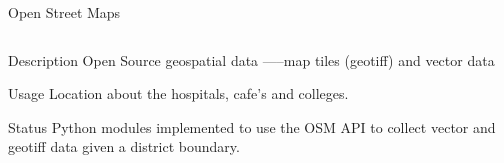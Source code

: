 \documentclass[t]{beamer}
\begin{document}
\begin{frame}{Open Street Maps}
	\begin{columns}[T,totalwidth=\textwidth]
        \begin{column}{0.45\textwidth}
	        \begin{block}{Description}
	           Open Source geospatial data -----map tiles (geotiff) and vector data
	        \end{block}
	        \begin{block}{Usage}
	           Location about the hospitals, cafe's and colleges.
	        \end{block}
	        \begin{block}{Status}
	         Python modules implemented to use the OSM API to collect vector and geotiff data given a district boundary.
	        \end{block}
	    \end{column}
	    

\end{columns}
\end{frame}
\end{document}
